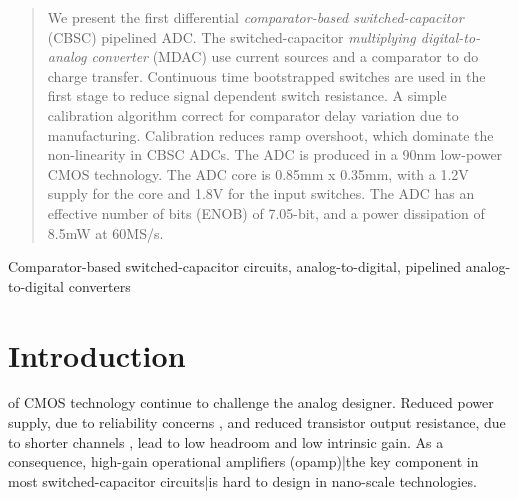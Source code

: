 


\begin{abstract}
We present the first differential \textit{comparator-based switched-capacitor}
(CBSC) pipelined ADC. The switched-capacitor \textit{multiplying 
digital-to-analog converter} (MDAC)
use current sources and a comparator to do charge transfer. Continuous
time bootstrapped switches are used in the first stage to reduce signal dependent switch
resistance. A simple calibration algorithm correct for
comparator delay variation due to manufacturing. Calibration reduces
ramp overshoot, which dominate the non-linearity in CBSC ADCs. The ADC is produced in a 90nm
low-power CMOS technology. The ADC core is 0.85mm x 0.35mm, with a
1.2V supply for the core and 1.8V for the input switches. The ADC
has an effective number of bits (ENOB) of 7.05-bit, and a power
dissipation of 8.5mW at 60MS/s. \\ 



\end{abstract}

\begin{IEEEkeywords}
 Comparator-based switched-capacitor circuits, analog-to-digital,
 pipelined analog-to-digital converters
\end{IEEEkeywords}
\section{Introduction}
 of CMOS technology continue to challenge the analog
designer. Reduced power supply, due to reliability concerns
\cite{iwai99}, and reduced
transistor output resistance, due to shorter channels
\cite{annema05}, lead to low headroom and low intrinsic
gain. As a consequence, high-gain
operational amplifiers (opamp)|the key component in most
switched-capacitor circuits|is hard to design in nano-scale
technologies.

